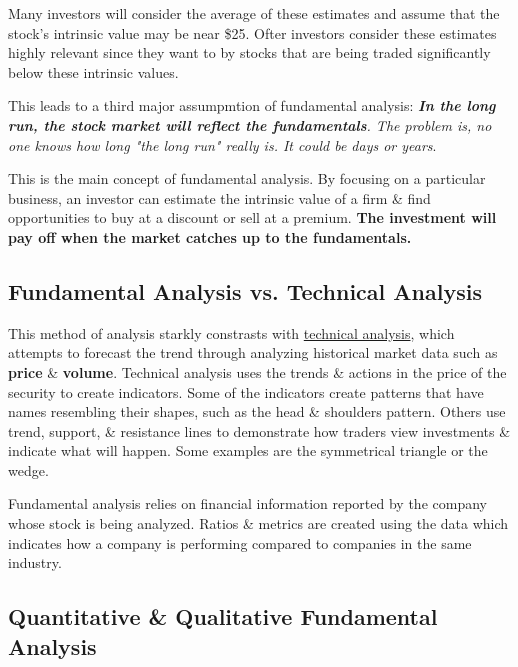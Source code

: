 \documentclass{article}
\begin{document}
	Many investors will consider the average of these estimates and assume that the stock's intrinsic value may be near \$25. Ofter investors consider these estimates highly relevant since they want to
	by stocks that are being traded significantly below these intrinsic values. \newline

	This leads to a third major assumpmtion of fundamental analysis: \textit{ {\bf In the long run, the stock market will reflect the fundamentals}. The problem is, no one knows how long "the long run"
	really is. It could be days or years}. \newline

	This is the main concept of fundamental analysis. By focusing on a particular business, an investor can estimate the intrinsic value of a firm \& find opportunities to buy at a discount or sell 
	at a premium.  {\bf The investment will pay off when the market catches up to the fundamentals.} \newline

	\subsection{Fundamental Analysis vs. Technical Analysis}

	This method of analysis starkly constrasts with \href{https://www.investopedia.com/terms/t/technicalanalysis.asp}{technical analysis}, which attempts to forecast the trend through analyzing
	historical market data such as {\bf price} \& {\bf volume}. Technical analysis uses the trends \& actions in the price of the security to create indicators. Some of the indicators create 
	patterns that have names resembling their shapes, such as the head \& shoulders pattern. Others use trend, support, \& resistance lines to demonstrate how traders view investments \& indicate what
	will happen. Some examples are the symmetrical triangle or the wedge. \newline

	Fundamental analysis relies on financial information reported by the company whose stock is being analyzed. Ratios \& metrics are created using the data which indicates how a company is performing
	compared to companies in the same industry.

	\subsection{Quantitative \& Qualitative Fundamental Analysis}
\end{document}
